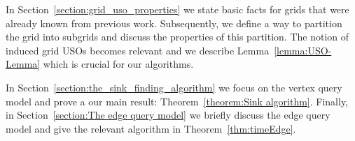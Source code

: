 \documentclass[runningheads,a4paper]{llncs}
\newcommand{\AT}[1]{\marginpar{\parbox{3.6cm}{{\small {\bf AT:} #1}}}} %
\begin{document}
In Section~\ref{section:grid_uso_properties} we state basic facts for grids that were already known from previous work. Subsequently, we define a way to partition the grid into subgrids and discuss the properties of this partition. The notion of induced grid USOs becomes relevant and we describe Lemma~\ref{lemma:USO-Lemma} which is crucial for our algorithms.

In Section~\ref{section:the_sink_finding_algorithm} we focus on the vertex query model and prove a our main result: Theorem~\ref{theorem:Sink algorithm}. Finally, in Section~\ref{section:The edge query model} we briefly discuss the edge query model and give the relevant algorithm in Theorem~\ref{thm:timeEdge}.







\end{document}
